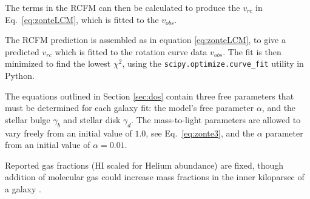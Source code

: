 \documentclass[reprint,%
 amsmath,amssymb,
 aps,
]{revtex4-1}
\begin{document}
The terms in the RCFM   can then be calculated  to produce the  $v_{rc}$ in Eq.~\ref{eq:zonteLCM}, which is  fitted to the  $v_{obs}$. 

 








The RCFM prediction is    assembled as in equation \ref{eq:zonteLCM}, to give a predicted $v_{rc}$ which is fitted to the rotation curve data $v_{obs}$. The fit is then minimized to find the  lowest   $\chi^2$,  using the {\tt scipy.optimize.curve\_fit} utility in Python.

The equations outlined in Section \ref{sec:dos} contain three free parameters that must be determined for each galaxy fit:  the model's free parameter $\alpha$,  and the   stellar bulge $\gamma_b$ and stellar disk $\gamma_d$. 
The mass-to-light parameters   are allowed to vary freely from an initial value of $1.0$, see Eq.~\ref{eq:zonte3}, and the $\alpha$ parameter     from an initial value of $\alpha = 0.01$. 

Reported gas fractions (HI scaled for Helium abundance) are fixed,  though addition of molecular gas could increase mass fractions in the inner kiloparsec of a galaxy   \cite{2004ApJ...609..652M}.
\end{document}
